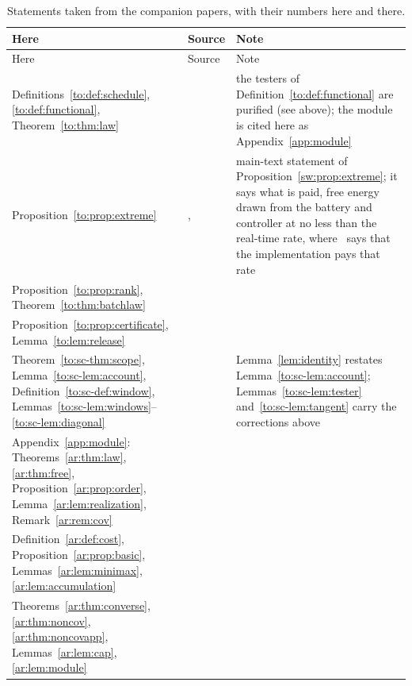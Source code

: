 \begin{small}
\begin{longtable}{@{}>{\raggedright\arraybackslash}p{}>{\raggedright\arraybackslash}p{}>{\raggedright\arraybackslash}p{}@{}}
\caption{Statements taken from the companion papers, with their numbers here and there.}\label{tab:companions}\\
\toprule
Here & Source & Note\\
\midrule
\endfirsthead
\toprule
Here & Source & Note\\
\midrule
\endhead
\bottomrule
\endfoot
Definitions~\ref{to:def:schedule}, \ref{to:def:functional}, Theorem~\ref{to:thm:law} & \cite[Defs.~1, 2, Thm.~1]{Order} & the testers of Definition~\ref{to:def:functional} are purified (see above); the module is cited here as Appendix~\ref{app:module}\\
Proposition~\ref{to:prop:extreme} & \cite[Prop.~2]{Order}, \cite[Prop.~8]{SaveWork} & main-text statement of Proposition~\ref{sw:prop:extreme}; it says what is paid, free energy drawn from the battery and controller at no less than the real-time rate, where~\cite[Prop.~2]{Order} says that the implementation pays that rate\\
Proposition~\ref{to:prop:rank}, Theorem~\ref{to:thm:batchlaw} & \cite[Prop.~3, Thm.~4]{Order} & \\
Proposition~\ref{to:prop:certificate}, Lemma~\ref{to:lem:release} & \cite[Prop.~6, Lemma~5]{Order} & \\
Theorem~\ref{to:sc-thm:scope}, Lemma~\ref{to:sc-lem:account}, Definition~\ref{to:sc-def:window}, Lemmas~\ref{to:sc-lem:windows}--\ref{to:sc-lem:diagonal} & \cite[Thm.~7, Lemma~8, Def.~3, Lemmas~9--15]{Order} & Lemma~\ref{lem:identity} restates Lemma~\ref{to:sc-lem:account}; Lemmas~\ref{to:sc-lem:tester} and~\ref{to:sc-lem:tangent} carry the corrections above\\
Appendix~\ref{app:module}: Theorems~\ref{ar:thm:law}, \ref{ar:thm:free}, Proposition~\ref{ar:prop:order}, Lemma~\ref{ar:lem:realization}, Remark~\ref{ar:rem:cov} & \cite[Thms.~1, 2, Prop.~3, Lemma~4, Remark~1]{Answering} & \\
Definition~\ref{ar:def:cost}, Proposition~\ref{ar:prop:basic}, Lemmas~\ref{ar:lem:minimax}, \ref{ar:lem:accumulation} & \cite[Def.~1, Prop.~5, Lemmas~6, 7]{Answering} & \\
Theorems~\ref{ar:thm:converse}, \ref{ar:thm:noncov}, \ref{ar:thm:noncovapp}, Lemmas~\ref{ar:lem:cap}, \ref{ar:lem:module} & \cite[Thms.~8, 9, 11, Lemmas~10, 12]{Answering} & \\

\end{longtable}
\end{small}
